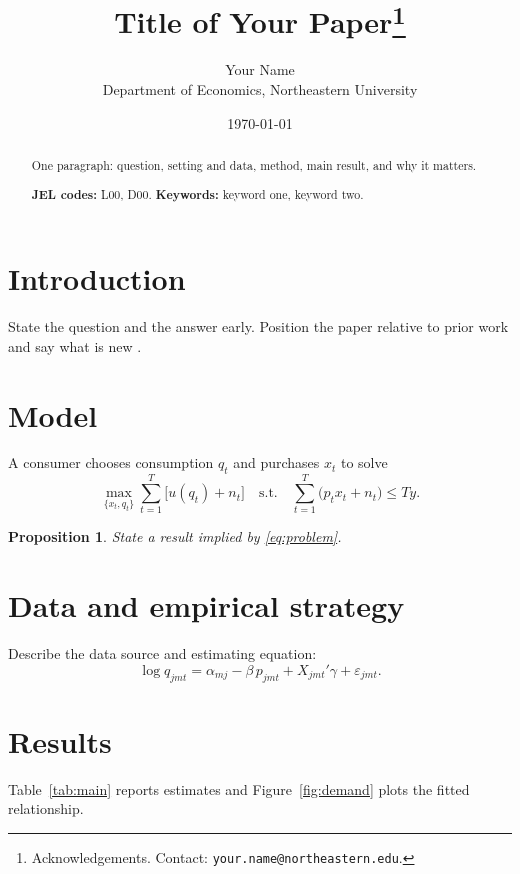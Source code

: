 \documentclass[12pt]{article}
\title{Title of Your Paper\thanks{Acknowledgements. Contact: \texttt{your.name@northeastern.edu}.}}
\author{Your Name\\ \small Department of Economics, Northeastern University}
\date{\today}
\newtheorem{proposition}{Proposition}
\begin{document}
\maketitle

\begin{abstract}
\noindent One paragraph: question, setting and data, method, main result, and why it matters.
\medskip

\noindent\textbf{JEL codes:} L00, D00. \quad \textbf{Keywords:} keyword one, keyword two.
\end{abstract}

\section{Introduction}
State the question and the answer early. Position the paper relative to prior work
\citep{placeholderA} and say what is new \citep[see also][]{placeholderB}.

\section{Model}
A consumer chooses consumption $q_t$ and purchases $x_t$ to solve
\begin{equation}
\max_{\{x_t,q_t\}} \sum_{t=1}^{T}\bigl[u(q_t)+n_t\bigr]
\quad\text{s.t.}\quad \sum_{t=1}^{T}\bigl(p_t x_t+n_t\bigr)\le T y .
\label{eq:problem}
\end{equation}
\begin{proposition}
State a result implied by \eqref{eq:problem}.
\end{proposition}

\section{Data and empirical strategy}
Describe the data source and estimating equation:
\begin{equation}
\log q_{jmt}=\alpha_{mj}-\beta\,p_{jmt}+X_{jmt}'\gamma+\varepsilon_{jmt}.
\end{equation}

\section{Results}
Table~\ref{tab:main} reports estimates and Figure~\ref{fig:demand} plots the fitted relationship.
\end{document}
